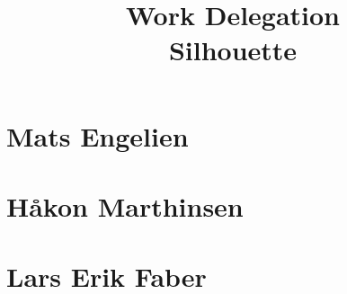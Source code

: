 \documentclass[12pt]{article}
\begin{document}
\title{%
    Work Delegation\\
    \large Silhouette}
\date{}
\maketitle

\section{Mats Engelien}

\section{Håkon Marthinsen}

\section{Lars Erik Faber}
\end{document}
